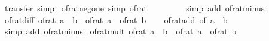 \begin{isabellebody}
%
\isatagproof
{}\isamarkupfalse%
\ transfer\ simp%
\endisatagproof
{\isafoldproof}%
%
\isadelimproof
\isanewline
%
\endisadelimproof
\isanewline
{}\isamarkupfalse%
\ of{\isacharunderscore}{\kern0pt}rat{\isacharunderscore}{\kern0pt}neg{\isacharunderscore}{\kern0pt}one\ {\isacharbrackleft}{\kern0pt}simp{\isacharbrackright}{\kern0pt}{\isacharcolon}{\kern0pt}\ {\isachardoublequoteopen}of{\isacharunderscore}{\kern0pt}rat\ {\isacharparenleft}{\kern0pt}{\isacharminus}{\kern0pt}\ {}{\isacharparenright}{\kern0pt}\ {\isacharequal}{\kern0pt}\ {\isacharminus}{\kern0pt}\ {}{\isachardoublequoteclose}\isanewline
%
\isadelimproof
\ \ %
\endisadelimproof
%
\isatagproof
{}\isamarkupfalse%
\ {\isacharparenleft}{\kern0pt}simp\ add{\isacharcolon}{\kern0pt}\ of{\isacharunderscore}{\kern0pt}rat{\isacharunderscore}{\kern0pt}minus{\isacharparenright}{\kern0pt}%
\endisatagproof
{\isafoldproof}%
%
\isadelimproof
\isanewline
%
\endisadelimproof
\isanewline
{}\isamarkupfalse%
\ of{\isacharunderscore}{\kern0pt}rat{\isacharunderscore}{\kern0pt}diff{\isacharcolon}{\kern0pt}\ {\isachardoublequoteopen}of{\isacharunderscore}{\kern0pt}rat\ {\isacharparenleft}{\kern0pt}a\ {\isacharminus}{\kern0pt}\ b{\isacharparenright}{\kern0pt}\ {\isacharequal}{\kern0pt}\ of{\isacharunderscore}{\kern0pt}rat\ a\ {\isacharminus}{\kern0pt}\ of{\isacharunderscore}{\kern0pt}rat\ b{\isachardoublequoteclose}\isanewline
%
\isadelimproof
\ \ %
\endisadelimproof
%
\isatagproof
{}\isamarkupfalse%
\ of{\isacharunderscore}{\kern0pt}rat{\isacharunderscore}{\kern0pt}add\ {\isacharbrackleft}{\kern0pt}of\ a\ {\isachardoublequoteopen}{\isacharminus}{\kern0pt}\ b{\isachardoublequoteclose}{\isacharbrackright}{\kern0pt}\ \isamarkupfalse%
\ {\isacharparenleft}{\kern0pt}simp\ add{\isacharcolon}{\kern0pt}\ of{\isacharunderscore}{\kern0pt}rat{\isacharunderscore}{\kern0pt}minus{\isacharparenright}{\kern0pt}%
\endisatagproof
{\isafoldproof}%
%
\isadelimproof
\isanewline
%
\endisadelimproof
\isanewline
{}\isamarkupfalse%
\ of{\isacharunderscore}{\kern0pt}rat{\isacharunderscore}{\kern0pt}mult{\isacharcolon}{\kern0pt}\ {\isachardoublequoteopen}of{\isacharunderscore}{\kern0pt}rat\ {\isacharparenleft}{\kern0pt}a\ {\isacharasterisk}{\kern0pt}\ b{\isacharparenright}{\kern0pt}\ {\isacharequal}{\kern0pt}\ of{\isacharunderscore}{\kern0pt}rat\ a\ {\isacharasterisk}{\kern0pt}\ of{\isacharunderscore}{\kern0pt}rat\ b{\isachardoublequoteclose}\isanewline
%
\isadelimproof
\ \ %
\endisadelimproof
%
\isatagproof
{}\isamarkupfalse%

\end{isabellebody}
